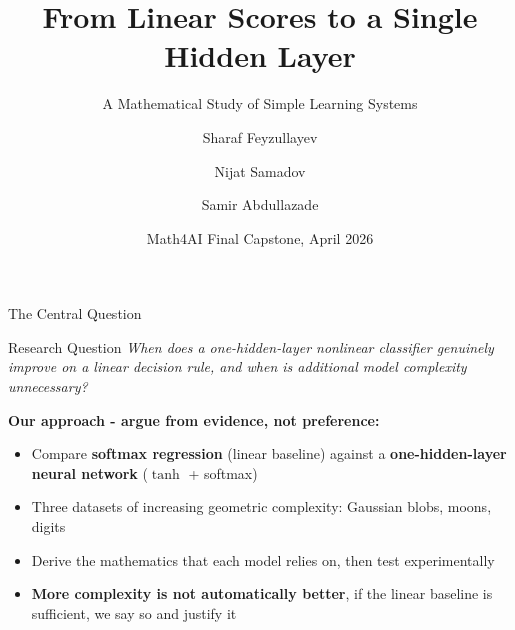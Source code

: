 \documentclass[11pt,aspectratio=169]{beamer}
\title[Math4AI Capstone]{From Linear Scores to a Single Hidden Layer}
\subtitle{A Mathematical Study of Simple Learning Systems}
\author[Feyzullayev, Samadov, Abdullazade]{Sharaf Feyzullayev \and Nijat Samadov \and Samir Abdullazade}
\institute{National AI Center --- AI Academy}
\date{Math4AI Final Capstone, April 2026}
\begin{document}
\begin{frame}
\titlepage
\end{frame}

\begin{frame}{The Central Question}

\begin{block}{Research Question}
\textit{When does a one-hidden-layer nonlinear classifier genuinely improve on a linear decision rule, and when is additional model complexity unnecessary?}
\end{block}

\vspace{0.6em}

\textbf{Our approach - argue from evidence, not preference:}
\begin{itemize}
    \item Compare \textbf{softmax regression} (linear baseline) against a \textbf{one-hidden-layer neural network} ($\tanh$ + softmax)
    \item Three datasets of increasing geometric complexity: Gaussian blobs, moons, digits
    \item Derive the mathematics that each model relies on, then test experimentally
    \item \textbf{More complexity is not automatically better}, if the linear baseline is sufficient, we say so and justify it
\end{itemize}
\end{frame}
\end{document}
